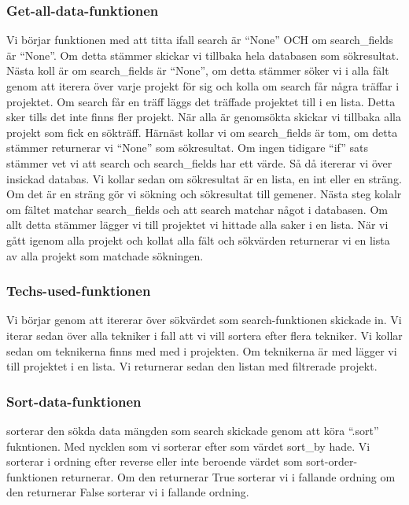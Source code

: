 \documentclass{TDP003mall}
\begin{document}
\subsubsection{Get-all-data-funktionen}
Vi börjar funktionen med att titta ifall search är ``None'' OCH om search\_fields är ``None''. Om detta stämmer skickar vi tillbaka hela databasen som sökresultat. Nästa koll är om search\_fields är ``None'', om detta stämmer söker vi i alla fält genom att iterera över varje projekt för sig och kolla om search får några träffar i projektet. Om search får en träff läggs det träffade projektet till i en lista. Detta sker tills det inte finns fler projekt. När alla är genomsökta skickar vi tillbaka alla projekt som fick en sökträff. Härnäst kollar vi om search\_fields är tom, om detta stämmer returnerar vi ``None'' som sökresultat. Om ingen tidigare ``if'' sats stämmer vet vi att search och search\_fields har ett värde. Så då itererar vi över insickad databas. Vi kollar sedan om sökresultat är en lista, en int eller en sträng. Om det är en sträng gör vi sökning och sökresultat till gemener. Nästa steg kolalr om fältet matchar search\_fields och att search matchar något i databasen. Om allt detta stämmer lägger vi till projektet vi hittade alla saker i en lista. När vi gått igenom alla projekt och kollat alla fält och sökvärden returnerar vi en lista av alla projekt som matchade sökningen.

\subsubsection{Techs-used-funktionen}
Vi börjar genom att itererar över sökvärdet som search-funktionen skickade in. Vi iterar sedan över alla tekniker i fall att vi vill sortera efter flera tekniker. Vi kollar sedan om teknikerna finns med med i projekten. Om teknikerna är med lägger vi till projektet i en lista. Vi returnerar sedan den listan med filtrerade projekt. 

\subsubsection{Sort-data-funktionen}
sorterar den sökda data mängden som search skickade genom att köra ``.sort'' fukntionen. Med nycklen som vi sorterar efter som värdet sort\_by hade. Vi sorterar i ordning efter reverse eller inte beroende värdet som sort-order-funktionen returnerar. Om den returnerar True sorterar vi i fallande ordning om den returnerar False sorterar vi i fallande ordning.
\end{document}
